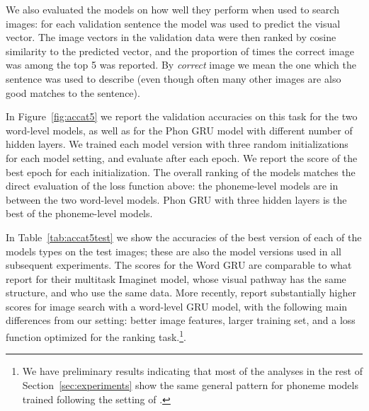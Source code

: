 We also evaluated the models on how well they perform when used to
search images: for each validation sentence the model was used to predict the
visual vector. The image vectors in the validation data were then
ranked by cosine similarity to the predicted vector, and the
proportion of times the correct image was among the top 5 was
reported. By {\it correct} image we mean the one which the sentence
was used to describe (even though often many other images are also
good matches to the sentence). 

In Figure~\ref{fig:accat5} we report the validation accuracies on this
task for the two word-level models, as well as for the Phon GRU
model with different number of hidden layers. We trained each model
version with three random initializations for each model setting, and
evaluate after each epoch. We report the score of the best epoch for
each initialization. 
The overall ranking of the models matches the direct
evaluation of the loss function above: the phoneme-level models are in
between the two word-level models. {\sc Phon GRU} with three
hidden layers is the best of the phoneme-level models.

In Table~\ref{tab:accat5test} we show the accuracies of the best
version of each of the models types on the test images; these are also
the model versions used in all subsequent experiments. The scores for 
the {\sc Word GRU} are comparable to what
 report for their multitask {\sc
  Imaginet} model, whose visual pathway has the same
structure, and who use the same data. 
More recently,  report substantially higher
scores for image search with a word-level GRU model, with the
following main differences from our setting: better image features,
larger training set, and a loss function optimized for the ranking
task.\footnote{We have preliminary results indicating that most of the
  analyses in the rest of Section~\ref{sec:experiments} show the same general
  pattern for phoneme models trained following the setting of
  .}.

